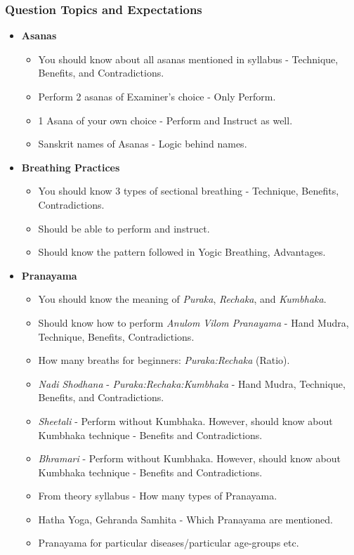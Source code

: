 \begin{frame}[fragile]
\begin{itemize}
    \end{itemize}
\end{frame}

\begin{frame}[fragile]\frametitle{Question Topics and Expectations}
    \begin{itemize}
        \item \textbf{Asanas}
        \begin{itemize}
            \item You should know about all asanas mentioned in syllabus - Technique, Benefits, and Contradictions.
            \item Perform 2 asanas of Examiner's choice - Only Perform.
            \item 1 Asana of your own choice - Perform and Instruct as well.
            \item Sanskrit names of Asanas - Logic behind names.
        \end{itemize}
        \item \textbf{Breathing Practices}
        \begin{itemize}
            \item You should know 3 types of sectional breathing - Technique, Benefits, Contradictions.
            \item Should be able to perform and instruct.
            \item Should know the pattern followed in Yogic Breathing, Advantages.
        \end{itemize}
        \item \textbf{Pranayama}
        \begin{itemize}
            \item You should know the meaning of \textit{Puraka}, \textit{Rechaka}, and \textit{Kumbhaka}.
            \item Should know how to perform \textit{Anulom Vilom Pranayama} - Hand Mudra, Technique, Benefits, Contradictions.
            \item How many breaths for beginners: \textit{Puraka:Rechaka} (Ratio).
            \item \textit{Nadi Shodhana} - \textit{Puraka:Rechaka:Kumbhaka} - Hand Mudra, Technique, Benefits, and Contradictions.
            \item \textit{Sheetali} - Perform without Kumbhaka. However, should know about Kumbhaka technique - Benefits and Contradictions.
            \item \textit{Bhramari} - Perform without Kumbhaka. However, should know about Kumbhaka technique - Benefits and Contradictions.
            \item From theory syllabus - How many types of Pranayama.
            \item Hatha Yoga, Gehranda Samhita - Which Pranayama are mentioned.
            \item Pranayama for particular diseases/particular age-groups etc.
        \end{itemize}		
    \end{itemize}
\end{frame}

